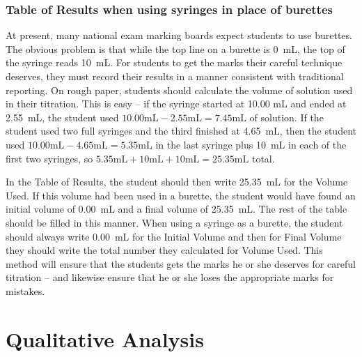 \subsubsection{Table of Results when using syringes in place of burettes}

At present, many national exam marking boards expect students to use burettes. The obvious problem is that while the top line on a burette is 0~mL, the top of the syringe reads 10~mL. For students to get the marks their careful technique deserves, they must record their results in a manner consistent with traditional reporting. On rough paper, students should calculate the volume of solution used in their titration. This is easy -- if the syringe started at 10.00 mL and ended at 2.55~mL, the student used $10.00 \mathrm{mL} - 2.55 \mathrm{mL} = 7.45 \mathrm{mL}$ of solution. If the student used two full syringes and the third finished at 4.65~mL, then the student used $10.00 \mathrm{mL} - 4.65 \mathrm{mL} = 5.35 \mathrm{mL}$ in the last syringe plus 10~mL in each of the first two syringes, so $5.35 \mathrm{mL} + 10 \mathrm{mL} + 10 \mathrm{mL} = 25.35 \mathrm{mL}$ total.

In the Table of Results, the student should then write 25.35~mL for the Volume Used. If this volume had been used in a burette, the student would have found an initial volume of 0.00~mL and a final volume of 25.35~mL. The rest of the table should be filled in this manner. When using a syringe as a burette, the student should always write 0.00~mL for the Initial Volume and then for Final Volume they should write the total number they calculated for Volume Used. This method will ensure that the students gets the marks he or she deserves for careful titration – and likewise ensure that he or she loses the appropriate marks for mistakes.





\section{Qualitative Analysis}
\label{cha:qualana}

